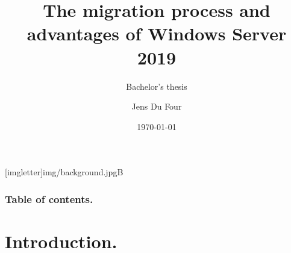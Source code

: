 \documentclass[aspectratio=169]{beamer}
\title{The migration process and advantages of Windows Server 2019}
\subtitle{Bachelor's thesis}
\author{Jens Du Four}
\date{\today}
\begin{document}
{
    [imgletter]{img/background.jpg}{B}  
    \begin{frame}
    \maketitle
    \end{frame}
}

\begin{frame}
  \frametitle{Table of contents.}
  \tableofcontents
\end{frame}
\section{Introduction.}
\end{document}
